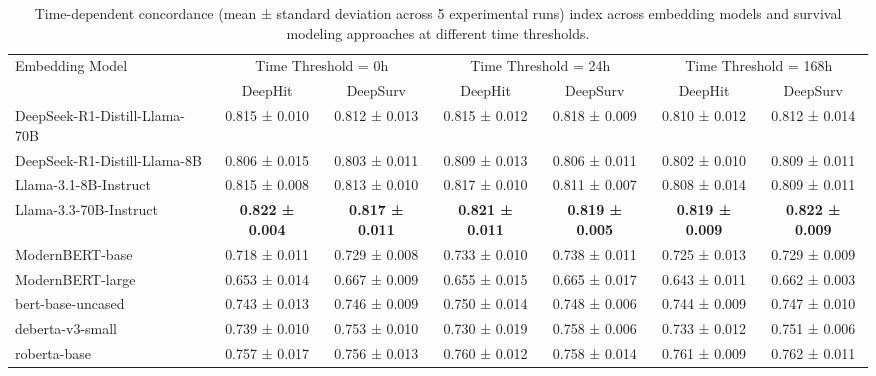 \begin{table}[!tbp]
\caption{Time-dependent concordance (mean ± standard deviation across 5 experimental runs) index across embedding models and survival modeling approaches at different time thresholds.} 
\label{tab:survival_results}
\centering
\begin{adjustbox}{width=\textwidth}
\begin{tabular}{lcccccc}
\toprule
\multirow{2}{*}{Embedding Model} & \multicolumn{2}{c}{Time Threshold = 0h} & \multicolumn{2}{c}{Time Threshold = 24h} & \multicolumn{2}{c}{Time Threshold = 168h} \\
\cmidrule(lr){2-3} \cmidrule(lr){4-5} \cmidrule(lr){6-7}
 & DeepHit & DeepSurv & DeepHit & DeepSurv & DeepHit & DeepSurv \\
\midrule
DeepSeek-R1-Distill-Llama-70B & 0.815 ± 0.010 & 0.812 ± 0.013 & 0.815 ± 0.012 & 0.818 ± 0.009 & 0.810 ± 0.012 & 0.812 ± 0.014 \\
DeepSeek-R1-Distill-Llama-8B & 0.806 ± 0.015 & 0.803 ± 0.011 & 0.809 ± 0.013 & 0.806 ± 0.011 & 0.802 ± 0.010 & 0.809 ± 0.011 \\
Llama-3.1-8B-Instruct & 0.815 ± 0.008 & 0.813 ± 0.010 & 0.817 ± 0.010 & 0.811 ± 0.007 & 0.808 ± 0.014 & 0.809 ± 0.011 \\
Llama-3.3-70B-Instruct & \textbf{0.822 ± 0.004} & \textbf{0.817 ± 0.011} & \textbf{0.821 ± 0.011} & \textbf{0.819 ± 0.005} & \textbf{0.819 ± 0.009} & \textbf{0.822 ± 0.009} \\
ModernBERT-base & 0.718 ± 0.011 & 0.729 ± 0.008 & 0.733 ± 0.010 & 0.738 ± 0.011 & 0.725 ± 0.013 & 0.729 ± 0.009 \\
ModernBERT-large & 0.653 ± 0.014 & 0.667 ± 0.009 & 0.655 ± 0.015 & 0.665 ± 0.017 & 0.643 ± 0.011 & 0.662 ± 0.003 \\
bert-base-uncased & 0.743 ± 0.013 & 0.746 ± 0.009 & 0.750 ± 0.014 & 0.748 ± 0.006 & 0.744 ± 0.009 & 0.747 ± 0.010 \\
deberta-v3-small & 0.739 ± 0.010 & 0.753 ± 0.010 & 0.730 ± 0.019 & 0.758 ± 0.006 & 0.733 ± 0.012 & 0.751 ± 0.006 \\
roberta-base & 0.757 ± 0.017 & 0.756 ± 0.013 & 0.760 ± 0.012 & 0.758 ± 0.014 & 0.761 ± 0.009 & 0.762 ± 0.011 \\
\bottomrule
\end{tabular}
\end{adjustbox}
\vspace{-1.5em}
\end{table}